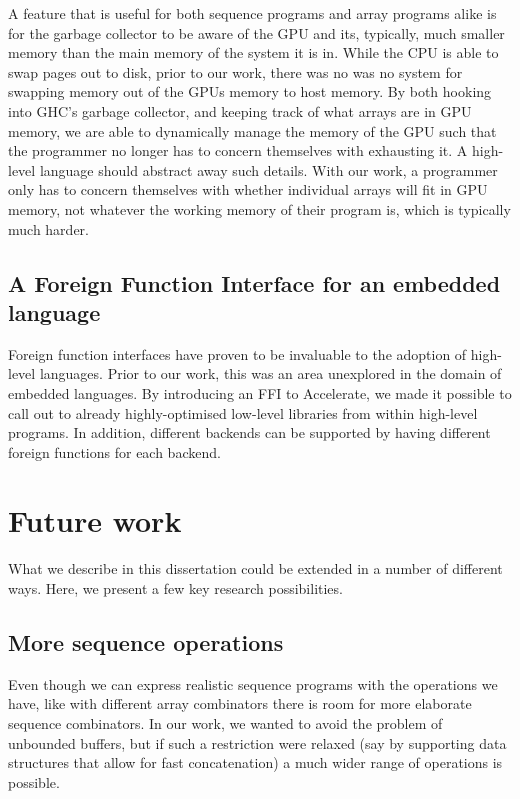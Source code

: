 A feature that is useful for both sequence programs and array programs alike is for the garbage collector to be aware of the GPU and its, typically, much smaller memory than the main memory of the system it is in. While the CPU is able to swap pages out to disk, prior to our work, there was no was no system for swapping memory out of the GPUs memory to host memory. By both hooking into GHC's garbage collector, and keeping track of what arrays are in GPU memory, we are able to dynamically manage the memory of the GPU such that the programmer no longer has to concern themselves with exhausting it. A high-level language should abstract away such details. With our work, a programmer only has to concern themselves with whether individual arrays will fit in GPU memory, not whatever the working memory of their program is, which is typically much harder.

\subsection{A Foreign Function Interface for an embedded language}

Foreign function interfaces have proven to be invaluable to the adoption of high-level languages\cite{Chakravarty:haskell-ffi}. Prior to our work, this was an area unexplored in the domain of embedded languages. By introducing an FFI to Accelerate, we made it possible to call out to already highly-optimised low-level libraries from within high-level programs. In addition, different backends can be supported by having different foreign functions for each backend.

\section{Future work}

What we describe in this dissertation could be extended in a number of different ways. Here, we present a few key research possibilities.

\subsection{More sequence operations}

Even though we can express realistic sequence programs with the operations we have, like with different array combinators there is room for more elaborate sequence combinators. In our work, we wanted to avoid the problem of unbounded buffers, but if such a restriction were relaxed (say by supporting data structures that allow for fast concatenation) a much wider range of operations is possible.

